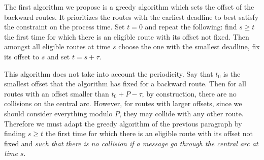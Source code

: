 \documentclass[a4paper,10pt]{article}
\begin{document}
    The first algorithm we propose is a greedy algorithm which sets the offset of the 
    backward routes. It prioritizes the routes with the earliest deadline to best satisfy the
    constraint on the process time.
    Set $t=0$ and repeat the following: find $s \geq t$ the first time for which there is an eligible route with its offset not fixed. Then amongst all eligible routes at time $s$ choose the one with the smallest deadline, fix its offset to $s$ and set $t = s + \tau$.
    
    This algorithm does not take into account the periodicity. Say that $t_0$ is the smallest offset that the algorithm has fixed
    for a backward route. Then for all routes with an offset smaller than $t_0 + P - \tau$,
    by construction, there are no collisions on the central arc.
    However, for routes with larger offsets, since we  should consider everything modulo $P$, 
    they may collide with any other route. Therefore we must adapt the greedy algorithm of the previous paragraph by finding $s \geq t$ the first time for which there is an eligible route with its offset not fixed and \emph{such that there is no collision if a message go
    through the central arc at time $s$}. 
    
\end{document}
